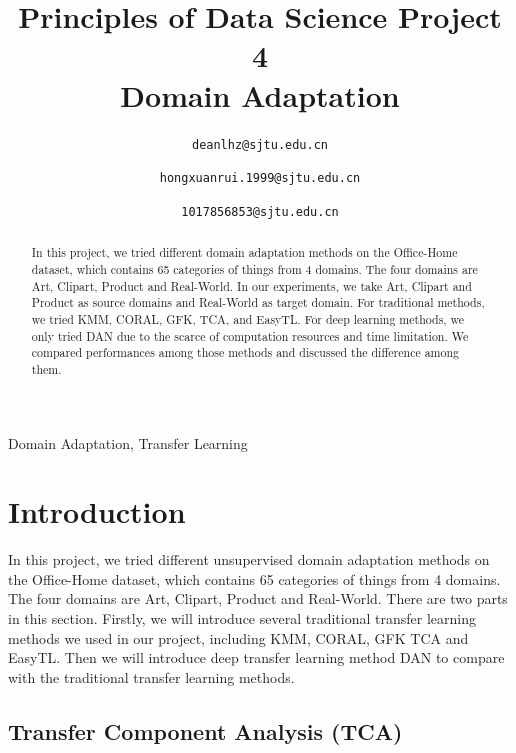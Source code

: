 \documentclass[conference]{IEEEtran}
\begin{document}


\title{Principles of Data Science Project 4\\
Domain Adaptation}

\author{
\texttt{deanlhz@sjtu.edu.cn}
\and
{}
\texttt{hongxuanrui.1999@sjtu.edu.cn}
\and
{}
\texttt{1017856853@sjtu.edu.cn}
}

\maketitle

\begin{abstract}
In this project, we tried different domain adaptation methods on the Office-Home dataset, which contains 65 categories of things from 4 domains.
The four domains are Art, Clipart, Product and Real-World. In our experiments, we take Art, Clipart and Product as source domains and Real-World as target domain.
For traditional methods, we tried KMM, CORAL, GFK, TCA, and EasyTL. For deep learning methods, we only tried DAN due to the scarce of computation resources and time limitation.
We compared performances among those methods and discussed the difference among them. 
\end{abstract}

\begin{IEEEkeywords}
Domain Adaptation, Transfer Learning
\end{IEEEkeywords}

\section{Introduction}

In this project, we tried different unsupervised domain adaptation methods on the Office-Home dataset, which contains 65 categories of things from 4 domains. The four domains are Art, Clipart, Product and Real-World. There are two parts in this section. Firstly, we will introduce several traditional transfer learning
methods we used in our project, including KMM, CORAL, GFK TCA and EasyTL. Then we will introduce deep transfer learning method DAN to compare with the traditional transfer learning methods.

\subsection{Transfer Component Analysis (TCA)}
\end{document}
